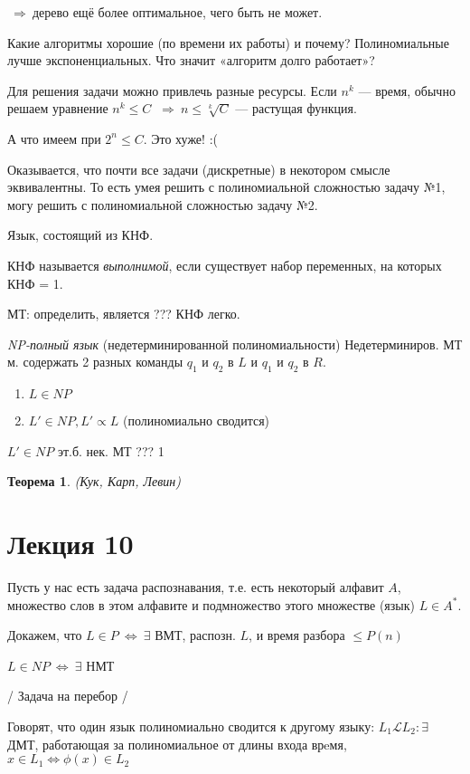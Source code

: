 \documentclass[draft]{report}
\newcommand{\then}{\ensuremath{\ \Rightarrow\ }}
\newcommand{\E}{\ensuremath{\exists}}
\renewcommand{\L}{\mathcal{L}}
\newcommand{\LRA}{\ensuremath{\Leftrightarrow}}
\newtheorem*  {theor}  {Теорема}
\theoremstyle {remark}
\theoremstyle {remark}
\newcommand{\s}[1]
{
\newpage
\phantomsection
\section*{\centering #1}
\addcontentsline{toc}{section}{#1}
}
\begin{document}
\then дерево ещё более оптимальное, чего быть не может.

Какие алгоритмы хорошие (по времени их работы) и почему? Полиномиальные лучше
экспоненциальных. Что значит «алгоритм долго работает»?

Для решения задачи можно привлечь разные ресурсы. Если \( n^k \) — время,
обычно решаем уравнение \( n^k \leqslant C \)
\then \( n \leqslant \sqrt[k]{C}\) — растущая функция.

А что имеем при \( 2^n \leqslant C \). Это хуже! :(

Оказывается, что почти все задачи (дискретные) в некотором смысле эквивалентны.
То есть умея решить с полиномиальной сложностью задачу №1, могу решить с
полиномиальной сложностью задачу №2.

Язык, состоящий из КНФ.

КНФ называется \emph{выполнимой}, если существует набор переменных, на которых
КНФ = 1.

МТ: определить, является ??? КНФ легко.

\emph{NP-полный язык} (недетерминированной полиномиальности)
Недетерминиров. МТ м. содержать 2 разных команды
\( q_1 \) и \( q_2 \) в \( L \) и
\( q_1 \) и \( q_2 \) в \( R \).

\begin{enumerate}
\item \( L  \in NP \)
\item \( L' \in NP, L' \propto L \) (полиномиально сводится)
\end{enumerate}
\( L' \in NP \) эт.б. нек. МТ ??? 1

\begin{theor}
(Кук, Карп, Левин)
\end{theor}





\s{[15.11.11] Лекция 10}

Пусть у нас есть задача распознавания, т.е. есть некоторый алфавит $A$, множество слов в этом алфавите и подмножество этого множестве (язык) $L\in A^*$.

Докажем, что $L\in P\ \Leftrightarrow\ \E$ ВМТ, распозн. $L$, и время разбора $\leq P(n)$

$L\in NP\ \Leftrightarrow\ \E$ НМТ

/ Задача на перебор /

Говорят, что один язык полиномиально сводится к другому языку: $L_1\L L_2\colon\E$ ДМТ, работающая за полиномиальное от длины входа врeмя, $x\in L_1\LRA\phi(x)\in L_2$
\end{document}
